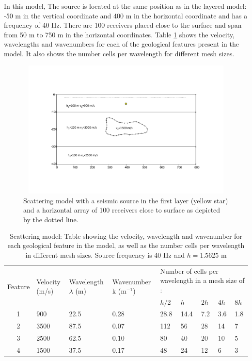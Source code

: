  In this model, The source is located at the same position as in the layered model: -50 m in the vertical coordinate and 400 m in the horizontal coordinate and has a frequency of 40 Hz. There are 100 receivers placed close to the surface and span from 50 m to 750 m in the horizontal coordinates. Table \ref{table:3.2} shows the velocity, wavelengths and wavenumbers for each of the geological features present in the model. It also shows the number cells per wavelength for different mesh sizes.

 \begin{figure}[h!]
	\centering
	\includegraphics[width=14cm, height=7cm]{Thesis_Edith/figures/scattering/scatter_source.pdf}
	\caption{Scattering model with a seismic source in the first layer (yellow star) and a horizontal array of 100 receivers close to surface as depicted by the dotted line.}
	\label{fig:3.23}
\end{figure}

\begin{table}[h!]
\footnotesize
\centering
    \begin{tabular}{|c|m{1.5cm}|m{2cm}|m{2cm}|m{1cm}| m{0.8cm}|m{0.8cm}|m{0.8cm}|m{0.8cm}|}
      \hline
      \multirow{2}{*}{Feature} &
      \multirow{2}{1.5cm}{Velocity (m/s)} &
      \multirow{2}{2cm}{Wavelength \quad $\lambda$ (m)} &
      \multirow{2}{2cm}{Wavenumber  k (m$^{-1}$)} &
         \multicolumn{5}{m{5cm}|}{Number of cells per wavelength in a mesh size of :} \\
         & & &  &$h/2$ & $h$ & $2h$ & $4h$ & $8h$ \\
      \hline
      1 & 900 & 22.5 & 0.28 & 28.8 & 14.4 & 7.2 & 3.6 & 1.8\\
      \hline
      2 & 3500 & 87.5 & 0.07 & 112 & 56 & 28 & 14 & 7\\
      \hline
      3 & 2500 & 62.5 & 0.10 & 80 & 40 & 20 & 10 & 5\\
      \hline
      4 & 1500 & 37.5 & 0.17 & 48 & 24 & 12 & 6 & 3\\
       \hline
    \end{tabular}
    \caption{Scattering model: Table showing the velocity, wavelength and wavenumber for each geological feature in the model, as well as the number cells per wavelength in different mesh sizes. Source frequency is 40 Hz and $h=$1.5625 m}
    \label{table:3.2}
\end{table}

